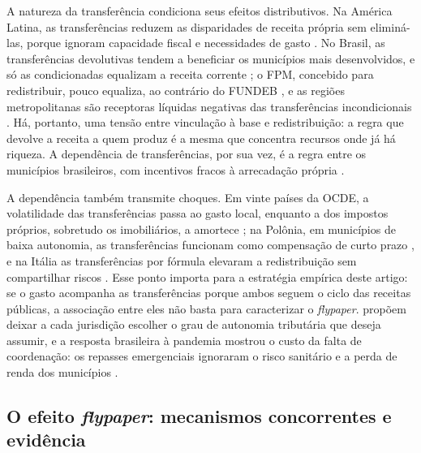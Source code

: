 A natureza da transferência condiciona seus efeitos distributivos. Na América Latina, as transferências reduzem as disparidades de receita própria sem eliminá-las, porque ignoram capacidade fiscal e necessidades de gasto \citep{Munoz201635}. No Brasil, as transferências devolutivas tendem a beneficiar os municípios mais desenvolvidos, e só as condicionadas equalizam a receita corrente \citep{daCosta2024}; o FPM, concebido para redistribuir, pouco equaliza, ao contrário do FUNDEB \citep{Baiao2017}, e as regiões metropolitanas são receptoras líquidas negativas das transferências incondicionais \citep{Politi2018486}. Há, portanto, uma tensão entre vinculação à base e redistribuição: a regra que devolve a receita a quem produz é a mesma que concentra recursos onde já há riqueza. A dependência de transferências, por sua vez, é a regra entre os municípios brasileiros, com incentivos fracos à arrecadação própria \citep{Suzart2018}.

A dependência também transmite choques. Em vinte países da OCDE, a volatilidade das transferências passa ao gasto local, enquanto a dos impostos próprios, sobretudo os imobiliários, a amortece \citep{Sacchi2017507}; na Polônia, em municípios de baixa autonomia, as transferências funcionam como compensação de curto prazo \citep{Kluza2025}, e na Itália as transferências por fórmula elevaram a redistribuição sem compartilhar riscos \citep{Arachi20231523}. Esse ponto importa para a estratégia empírica deste artigo: se o gasto acompanha as transferências porque ambos seguem o ciclo das receitas públicas, a associação entre eles não basta para caracterizar o \textit{flypaper}. \citet{Bell2021617} propõem deixar a cada jurisdição escolher o grau de autonomia tributária que deseja assumir, e a resposta brasileira à pandemia mostrou o custo da falta de coordenação: os repasses emergenciais ignoraram o risco sanitário e a perda de renda dos municípios \citep{Cardoso2023106}.

\subsection{O efeito \textit{flypaper}: mecanismos concorrentes e evidência}\label{sec:flypaper}

